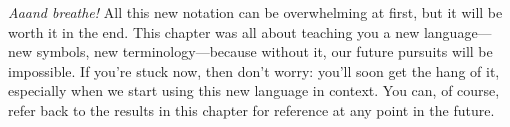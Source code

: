 \textit{Aaand breathe!} All this new notation can be overwhelming at first, but it will be worth it in the end. This chapter was all about teaching you a new language---new symbols, new terminology---because without it, our future pursuits will be impossible. If you're stuck now, then don't worry: you'll soon get the hang of it, especially when we start using this new language in context. You can, of course, refer back to the results in this chapter for reference at any point in the future.